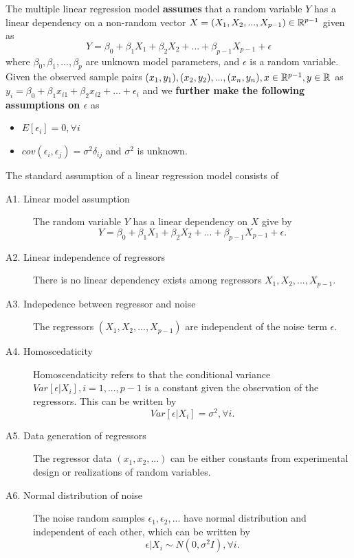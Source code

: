 \begin{refsection}
\begin{definition}\label{ch:statistical-models:def:multipleLinearRegressionModel}
	The multiple linear regression model \textbf{assumes} that a random variable $Y$ has a linear dependency on a non-random vector $X = (X_1,X_2,...,X_{p-1}) \in \mathbb{R}^{p-1}$ given as
	$$Y = \beta_0 + \beta_1 X_1 +\beta_2 X_2 + ... +\beta_{p-1} X_{p-1} + \epsilon$$
	where $\beta_0,\beta_1, ...,\beta_p$ are unknown model parameters, and $\epsilon$ is a random variable. 
	Given the observed sample pairs $(x_1,y_1),(x_2,y_2),..., (x_n,y_n), x\in \mathbb{R}^{p-1}, y\in \mathbb{R}$ as $y_i = \beta_0 + \beta_1 x_{i1} + \beta_2 x_{i2} + ... + \epsilon_i$ and we \textbf{further make the following assumptions on $\epsilon$} as
	\begin{itemize}
		\item $E[\epsilon_i] = 0,\forall i$
		\item $cov(\epsilon_i,\epsilon_j) = \sigma^2\delta_{ij}$ and $\sigma^2$ is unknown.
	\end{itemize} 	
\end{definition}

\begin{assumption}\label{ch:regression-analysis:assumption:LinearRegressionStandardAssumption} \cite[17]{greene2017econometric}
The standard assumption of a linear regression model consists of
\begin{description}
	\item[A1. Linear model assumption] The random variable $Y$ has a linear dependency on $X$ give by
	$$Y = \beta_0 + \beta_1 X_1 +\beta_2 X_2 + ... +\beta_{p-1} X_{p-1} + \epsilon.$$
	\item[A2. Linear independence of regressors] There is no linear dependency exists among regressors $X_1, X_2,...,X_{p-1}$.  
	\item[A3. Indepedence between regressor and noise] The regressors $(X_1,X_2,...,X_{p-1})$ are independent of the noise term $\epsilon$.
	\item[A4. Homoscedaticity] Homoscendaticity refers to that the conditional variance $Var[\epsilon|X_i],i=1,...,p-1$ is a constant given the observation of the regressors. This can be written by
	$$ Var[\epsilon | X_i] = \sigma^2, \forall i.$$  
	\item[A5. Data generation of regressors] The regressor data $(x_1,x_2,...)$ can be either constants from experimental design or realizations of random variables. 
	\item[A6. Normal distribution of noise] The noise random samples $\epsilon_1, \epsilon_2,...$ have normal distribution and independent of each other, which can be written by
	$$\epsilon | X_i \sim N(0, \sigma^2 I), \forall i.$$ 
\end{description}	
\end{assumption}


\end{refsection}
